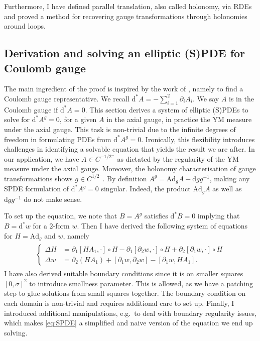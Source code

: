 \documentclass[12pt]{article}
\numberwithin{equation}{section}
\theoremstyle{definition}
\theoremstyle{remark}
\newcommand{\Ad}{\mathrm{Ad}}
\newcommand{\diff}{\mathrm{d}}
\newcommand{\1}{\mathbf 1}
\newcommand{\<}{\langle}
\renewcommand{\>}{\rangle}
\begin{document}
   Furthermore, I have defined parallel translation, also called holonomy, via RDEs and proved a method for recovering gauge transformations through holonomies around loops.

\subsection{Derivation and solving an elliptic (S)PDE for Coulomb gauge}
The main ingredient of the proof is inspired by the work of \cite{Uhlenbeck82}, namely to find a Coulomb gauge representative. We recall $\diff^*A=-\sum_{i=1}^2\partial_i A_i$. We say $A$ is in the Coulomb gauge if $\diff^*A=0$. This section derives a system of elliptic (S)PDEs to solve for $\diff^*A^g=0$, for a given $A$ in the axial gauge, in practice the YM measure under the axial gauge.  This task is non-trivial due to the infinite degrees of freedom in formulating PDEs from $\diff^*A^g=0$. Ironically, this flexibility introduces challenges in identifying a solvable equation that yields the result we are after. In our application, we have $A\in C^{-1/2^-}$ as dictated by the regularity of the YM measure under the axial gauge. Moreover, the holonomy characterisation of gauge transformations shows $g\in C^{1/ 2^-}$. By definition $A^g=\Ad_gA-\diff gg^{-1}$, making any SPDE formulation of $\diff^*A^g=0$ singular. Indeed, the product $\Ad_gA$ as well as $\diff gg^{-1}$ do not make sense.  

To set up the equation, we note that $B=A^g$ satisfies $\diff^*B=0$ implying that $B=\diff^*w$ for a $2$-form $w$. Then I have derived the following system of equations for $H=\Ad_g$ and $w$, namely 
  \begin{align}\label{eq:SPDE}
  \begin{split}
          \begin{cases}
          \Delta H&=\partial_1 [HA_1,\cdot]\circ H-\partial_1[\partial_2w,\cdot]\circ H+\partial_2[\partial_1w,\cdot]\circ H\\
          \Delta w&=\partial_2(HA_1)+[\partial_1w,\partial_2w]-[\partial_1w,HA_1].
          \end{cases}
          \end{split}
          \end{align}
I have also derived suitable boundary conditions since it is on smaller squares $[0,\sigma]^2$ to introduce smallness parameter. This is allowed, as we have a patching step to glue solutions from small squares together. The boundary condition on each domain is non-trivial and requires additional care to set up. Finally, I introduced additional manipulations, e.g.\ to deal with boundary regularity issues, %
which makes \eqref{eq:SPDE} a simplified and naive version of the equation we end up solving.  
\end{document}
